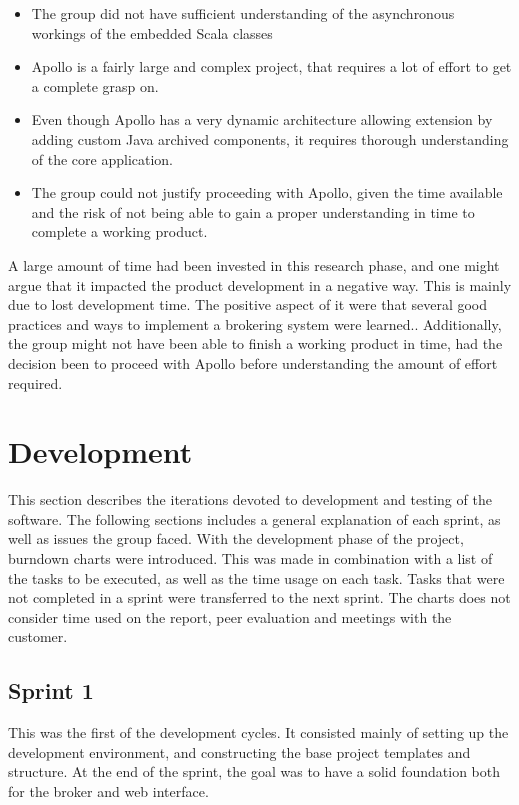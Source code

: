 \begin{itemize}
\item The group did not have sufficient understanding of the asynchronous workings of the embedded Scala classes
\item Apollo is a fairly large and complex project, that requires a lot of effort to get a complete grasp on.
\item Even though Apollo has a very dynamic architecture  allowing extension by adding custom Java archived components, it requires thorough understanding of the core application.
\item The group could not justify proceeding with Apollo, given the time available and the risk of not being able to gain a proper understanding in time to complete a working product.
\end{itemize}

A large amount of time had been invested in this research phase, and one might argue that it impacted the product development in a negative way. This is mainly due to lost development time. The positive aspect of it were that several good practices and ways to implement a brokering system were learned.. Additionally, the group might not have been able to finish a working product in time, had the decision been to proceed with Apollo before understanding the amount of effort required.

\section{Development}
\label{subsec:project_lifecycle-development}

This section describes the iterations devoted to development and testing of the software. The following sections includes a general explanation of each sprint, as well as issues the group faced. With the development phase of the project, burndown charts were introduced. This was made in combination with a list of the tasks to be executed, as well as the time usage on each task. Tasks that were not completed in a sprint were transferred to the next sprint. The charts does not consider time used on the report, peer evaluation and meetings with the customer.

\subsection{Sprint 1}
\label{subsec:project_lifecycle-development-sprint_1}

This was the first of the development cycles. It consisted mainly of setting up the development environment, and constructing the base project templates and structure. At the end of the sprint, the goal was to have a solid foundation both for the broker and web interface.

